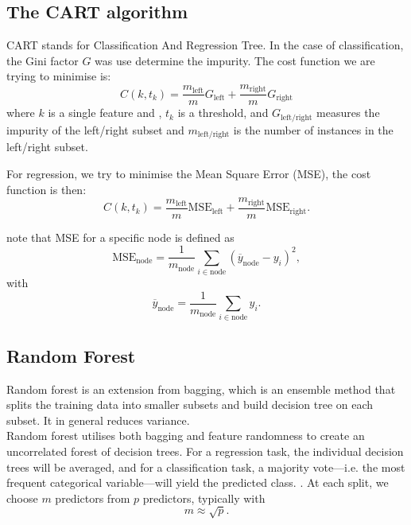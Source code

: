 \documentclass[english,notitlepage,reprint,nofootinbib]{revtex4-1}
\begin{document}
\subsection{The CART algorithm}\label{sub:cart}
CART stands for Classification And Regression Tree. In the case of classification, the Gini factor $ G $ was use determine the impurity. The cost function we are trying to minimise is:
\[ C(k,t_k) = \frac{m_{\mathrm{left}}}{m}G_{\mathrm{left}}+ \frac{m_{\mathrm{right}}}{m}G_{\mathrm{right}} \] 
where $ k $ is a single feature and , $ t_k $ is a threshold, and $G_{\mathrm{left/right}}$ measures the impurity of the left/right subset  and $m_{\mathrm{left/right}}$ is the number of instances in the left/right subset.

For regression, we try to minimise the Mean Square Error (MSE), the cost function is then:
\[C(k,t_k) = \frac{m_{\mathrm{left}}}{m}\mathrm{MSE}_{\mathrm{left}}+ \frac{m_{\mathrm{right}}}{m}\mathrm{MSE}_{\mathrm{right}}. \]

note that MSE for a specific node is defined as 
\[ \mathrm{MSE}_{\mathrm{node}}=\frac{1}{m_\mathrm{node}}\sum_{i\in \mathrm{node}}(\overline{y}_{\mathrm{node}}-y_i)^2, \] 
with 
\[ \overline{y}_{\mathrm{node}}=\frac{1}{m_\mathrm{node}}\sum_{i\in \mathrm{node}}y_i. \] \cite{hjorth-jensen}

\subsection{Random Forest}
Random forest is an extension from bagging, which is an ensemble method that splits the training data into smaller subsets and build decision tree on each subset. It in general reduces variance. \\ Random forest utilises both bagging and feature randomness to create an uncorrelated forest of decision trees. For a regression task, the individual decision trees will be averaged, and for a classification task, a majority vote—i.e. the most frequent categorical variable—will yield the predicted class. \cite{ibm}. 
At each split, we choose $ m $ predictors from $ p $ predictors, typically with
\[ m\approx \sqrt{p}. \] 
\end{document}
